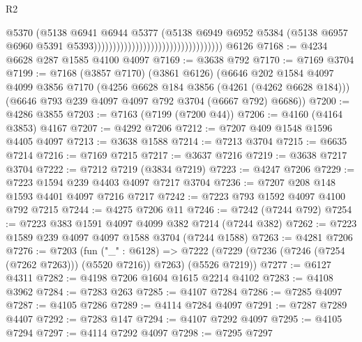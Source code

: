 \begin{lexlean}{R2}
\begin{coremodule}
                                                                  @5370
                                                                  (@5138
                                                                    @6941
                                                                    @6944
                                                                    @5377
                                                                    (@5138
                                                                      @6949
                                                                      @6952
                                                                      @5384
                                                                      (@5138
                                                                        @6957
                                                                        @6960
                                                                        @5391
                                                                        @5393))))))))))))))))))))))))))))))))))
    @6126
@7168 := @4234 @6628 @287 @1585 @4100 @4097
@7169 := @3638 @792
@7170 := @7169 @3704
@7199 := @7168
    (@3857 @7170)
    (@3861 @6126)
    (@6646
      @202
      @1584
      @4097
      @4099
      @3856
      @7170
      (@4256 @6628 @184 @3856 (@4261 (@4262 @6628 @184)))
      (@6646 @793 @239 @4097 @4097 @792 @3704 (@6667 @792) @6686))
@7200 := @4286 @3855
@7203 := @7163 (@7199 (@7200 @44))
@7206 := @4160 (@4164 @3853) @4167
@7207 := @4292 @7206
@7212 := @7207 @409 @1548 @1596 @4405 @4097
@7213 := @3638 @1588
@7214 := @7213 @3704
@7215 := @6635 @7214
@7216 := @7169 @7215
@7217 := @3637 @7216
@7219 := @3638 @7217 @3704
@7222 := @7212 @7219 (@3834 @7219)
@7223 := @4247 @7206
@7229 := @7223 @1594 @239 @4403 @4097 @7217 @3704
@7236 := @7207 @208 @148 @1593 @4401 @4097 @7216 @7217
@7242 := @7223 @793 @1592 @4097 @4100 @792 @7215
@7244 := @4275 @7206 @11
@7246 := @7242 (@7244 @792)
@7254 := @7223 @383 @1591 @4097 @4099 @382 @7214 (@7244 @382)
@7262 := @7223 @1589 @239 @4097 @4097 @1588 @3704 (@7244 @1588)
@7263 := @4281 @7206
@7276 := @7203
    (fun ("_" : @6128) =>
    @7222 (@7229 (@7236 (@7246 (@7254 (@7262 @7263))) (@5520 @7216)) @7263) (@5526 @7219))
@7277 := @6127 @4311
@7282 := @4198 @7206 @1604 @1615 @2214 @4102
@7283 := @4108 @3962
@7284 := @7283 @263
@7285 := @4107 @7284
@7286 := @7285 @4097
@7287 := @4105 @7286
@7289 := @4114 @7284 @4097
@7291 := @7287 @7289 @4407
@7292 := @7283 @147
@7294 := @4107 @7292 @4097
@7295 := @4105 @7294
@7297 := @4114 @7292 @4097
@7298 := @7295 @7297

\end{coremodule}
\end{lexlean}
